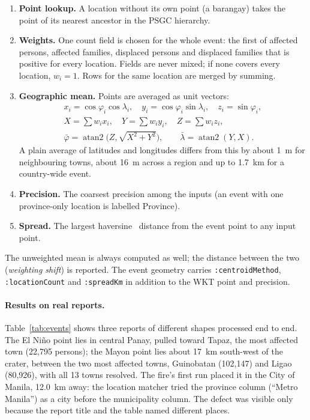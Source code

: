 \documentclass[acmtog]{acmart}
\begin{document}
\begin{enumerate}
\item \textbf{Point lookup.} A location without its own point (a barangay) takes the point of its
  nearest ancestor in the PSGC hierarchy.
\item \textbf{Weights.} One count field is chosen for the whole event: the first of affected
  persons, affected families, displaced persons and displaced families that is positive for
  every location. Fields are never mixed; if none covers every location, $w_i = 1$. Rows for the
  same location are merged by summing.
\item \textbf{Geographic mean.} Points are averaged as unit vectors:
  \begin{gather*}
    x_i = \cos\varphi_i\cos\lambda_i,\quad y_i = \cos\varphi_i\sin\lambda_i,\quad z_i = \sin\varphi_i,\\
    X = \textstyle\sum w_i x_i,\quad Y = \textstyle\sum w_i y_i,\quad Z = \textstyle\sum w_i z_i,\\
    \bar\varphi = \operatorname{atan2}\bigl(Z, \sqrt{X^2+Y^2}\bigr),\qquad \bar\lambda = \operatorname{atan2}(Y, X).
  \end{gather*}
  A plain average of latitudes and longitudes differs from this by about 1~m for neighbouring
  towns, about 16~m across a region and up to 1.7~km for a country-wide event.
\item \textbf{Precision.} The coarsest precision among the inputs (an event with one
  province-only location is labelled Province).
\item \textbf{Spread.} The largest haversine~\cite{sinnott1984haversine} distance from the event
  point to any input point.
\end{enumerate}

The unweighted mean is always computed as well; the distance between the two (\emph{weighting
shift}) is reported. The event geometry carries \texttt{:centroidMethod},
\texttt{:locationCount} and \texttt{:spreadKm} in addition to the WKT point and precision.

\paragraph{Results on real reports.} Table~\ref{tab:events} shows three reports of different
shapes processed end to end. The El Ni\~no point lies in central Panay, pulled toward Tapaz, the
most affected town (22,795 persons); the Mayon point lies about 17~km south-west of the crater,
between the two most affected towns, Guinobatan (102,147) and Ligao (80,926), with all 13 towns
resolved. The fire's first run placed it in the City of Manila, 12.0~km away: the location matcher
tried the province column (``Metro Manila'') as a city before the municipality column. The defect
was visible only because the report title and the table named different places.
\end{document}
